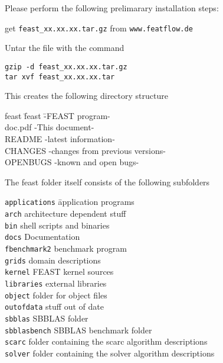 
Please perform the following prelimarary installation steps:

get \verb+feast_xx.xx.xx.tar.gz+ from \verb+www.featflow.de+

Untar the file with the command

\begin{verbatim}
gzip -d feast_xx.xx.xx.tar.gz
tar xvf feast_xx.xx.xx.tar
\end{verbatim}

This creates the following directory structure

\begin{tabbing}
feast \phantom{xxxxxxxx} \= feast \phantom{xxxxxxxxxxxxxxx} \=  -FEAST program- \\
      \> doc.pdf  \> -This document-\\
      \> README  \> -latest information-\\
      \> CHANGES \> -changes from previous versions-\\
      \> OPENBUGS \> -known and open bugs-\\
\end{tabbing}

The feast folder itself consists of the following subfolders

\begin{tabbing}
\verb+applications+ \phantom{xxxxxxxx} \= application programs \\
\verb+arch+ \> architecture dependent stuff\\
\verb+bin+ \> shell scripts and binaries\\
\verb+docs+ \> Documentation\\
\verb+fbenchmark2+  \> benchmark program \\
\verb+grids+ \> domain descriptions \\
\verb+kernel+ \> FEAST kernel sources\\
\verb+libraries+ \> external libraries \\
\verb+object+ \> folder for object files \\
\verb+outofdata+ \> stuff out of date\\
\verb+sbblas+ \> SBBLAS folder \\
\verb+sbblasbench+ \> SBBLAS benchmark folder \\
\verb+scarc+   \> folder containing the scarc algorithm descriptions\\
\verb+solver+   \> folder containing the solver algorithm descriptions
\end{tabbing}

